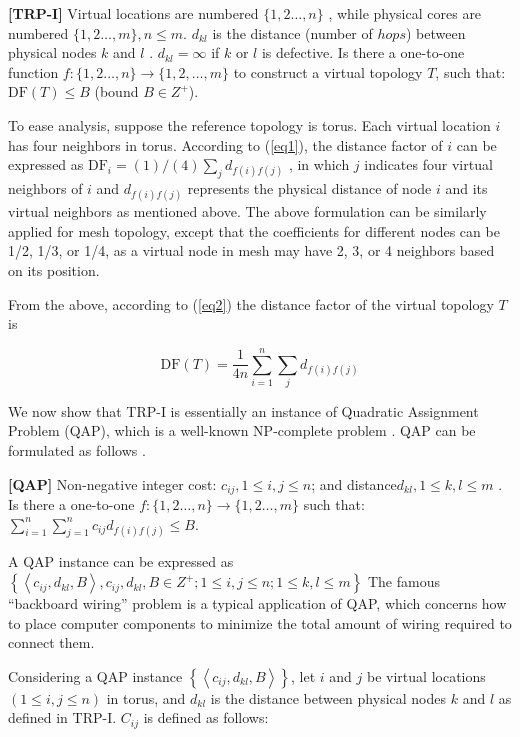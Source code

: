 \textbf{[TRP-I]} Virtual locations are numbered $\{1,2 \ldots, n\}$ , while physical cores are numbered $\{1,2 \ldots, m\}, n \leq m$. $d_{k l}$ is the distance (number of $hops$) between physical nodes $k$  and $l$ . $d_{k l}=\infty$ if $k$  or $l$ is defective. Is there a one-to-one function  $f:\{1,2 \ldots, n\} \rightarrow\{1,2, \ldots, m\}$ to construct a virtual topology $T$, such that:$\mathrm{DF}(T) \leq B$ (bound $B \in Z^{+}$).

To ease analysis, suppose the reference topology is torus. Each virtual location $i$ has four neighbors in torus. According to (\ref{eq1}), the distance factor of $i$ can be expressed as $\mathrm{DF}_{i}=(1) /(4) \sum_{j} d_{f(i) f(j)}$ , in which $j$ indicates four virtual neighbors of $i$  and $d_{f(i) f(j)}$    represents the physical distance of node $i$ and its virtual neighbors as mentioned above. The above formulation can be similarly applied for mesh topology, except that the coefficients for different nodes can be 1/2, 1/3, or 1/4, as a virtual node in mesh may have 2, 3, or 4 neighbors based on its position.

From the above, according to (\ref{eq2}) the distance factor of the virtual topology $T$ is

\begin{equation}
    \mathrm{DF}(T)=\frac{1}{4 n} \sum_{i=1}^{n} \sum_{j} d_{f(i) f(j)}
            \label{eq5}
\end{equation}

We now show that TRP-I is essentially an instance of Quadratic Assignment Problem (QAP), which is a well-known NP-complete problem \cite{sahni1976p}. QAP can be formulated as follows \cite{hartmanis1982computers}.

\textbf{[QAP]} Non-negative integer cost: $c_{i j}, 1\leq i, j \leq n$; and distance$d_{k l}, 1 \leq k, l \leq m$ . Is there  a one-to-one  $f:\{1,2 \ldots, n\} \rightarrow\{1,2 \ldots, m\}$  such that:$\sum_{i=1}^{n} \sum_{j=1}^{n} c_{i j} d_{f(i) f(j)} \leq B$.

A QAP instance can be expressed as 
$\left\{\left\langle c_{i j}, d_{k l}, B\right\rangle, c_{i j}, d_{k l}, B \in Z^{+} ; 1 \leq i, j \leq n ; 1 \leq k, l \leq m\right\}$
The famous “backboard wiring” problem \cite{steinberg1961backboard} is a typical application of QAP, which concerns how to place computer components to minimize the total amount of wiring required to connect them.

Considering a QAP instance $\left\{\left\langle c_{i j}, d_{k l}, B\right\rangle\right\}$, let $i$ and $j$ be virtual locations $(1 \leq i, j \leq n)$ in torus, and $d_{k l}$ is the distance between physical nodes $k$ and $l$ as defined in TRP-I. $C_{i j}$ is defined as follows:

